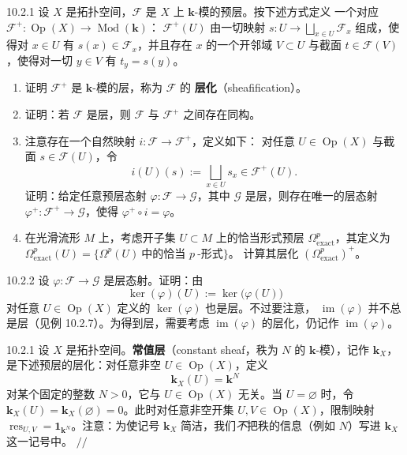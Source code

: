 \begin{wexer}{10.2.1}
  设 $X$ 是拓扑空间，$\mathcal{F}$ 是 $X$ 上 $\mathbf{k}$-模的预层。按下述方式定义
  一个对应 $\mathcal{F}^+\colon\operatorname{Op}(X)\to\operatorname{Mod}(\mathbf{k})$：
  $\mathcal{F}^+(U)$ 由一切映射 $s\colon U\to\bigsqcup_{x\in U}\mathcal{F}_x$
  组成，使得对 $x\in U$ 有 $s(x)\in\mathcal{F}_x$，并且存在 $x$ 的一个开邻域
  $V\subset U$ 与截面 $t\in\mathcal{F}(V)$，使得对一切 $y\in V$ 有
  $t_y=s(y)$。
  \begin{enumerate}[label=(\roman*)]
    \item 证明 $\mathcal{F}^+$ 是 $\mathbf{k}$-模的层，称为 $\mathcal{F}$ 的
          \textbf{层化}（sheafification）。
    \item 证明：若 $\mathcal{F}$ 是层，则 $\mathcal{F}$ 与 $\mathcal{F}^+$
          之间存在同构。
    \item 注意存在一个自然映射 $i\colon\mathcal{F}\to\mathcal{F}^+$，定义如下：
          对任意 $U\in\operatorname{Op}(X)$ 与截面 $s\in\mathcal{F}(U)$，令
          \[
            i(U)(s):=\bigsqcup_{x\in U}s_x\in\mathcal{F}^+(U).
          \]
          证明：给定任意预层态射 $\varphi\colon\mathcal{F}\to\mathcal{G}$，其中
          $\mathcal{G}$ 是层，则存在唯一的层态射
          $\varphi^+\colon\mathcal{F}^+\to\mathcal{G}$，使得
          $\varphi^+\circ i=\varphi$。
    \item 在光滑流形 $M$ 上，考虑开子集 $U\subset M$ 上的恰当形式预层
          $\Omega^p_{\mathrm{exact}}$，其定义为
          $\Omega^p_{\mathrm{exact}}(U)=\{\Omega^p(U)\ \text{中的恰当 } p\ \text{-形式}\}$。
          计算其层化 $(\Omega^p_{\mathrm{exact}})^+$。
  \end{enumerate}
\end{wexer}

\begin{wexer}{10.2.2}
  设 $\varphi\colon\mathcal{F}\to\mathcal{G}$ 是层态射。证明：由
  \[
    \ker(\varphi)(U):=\ker\bigl(\varphi(U)\bigr)
  \]
  对任意 $U\in\operatorname{Op}(X)$ 定义的 $\ker(\varphi)$ 也是层。不过要注意，
  $\operatorname{im}(\varphi)$ 并不总是层（见例 10.2.7）。为得到层，需要考虑
  $\operatorname{im}(\varphi)$ 的层化，仍记作 $\operatorname{im}(\varphi)$。
\end{wexer}

\begin{wexam}{10.2.1}
  设 $X$ 是拓扑空间。\textbf{常值层}（constant sheaf，秩为 $N$ 的
  $\mathbf{k}$-模），记作 $\mathbf{k}_X$，是下述预层的层化：对任意非空
  $U\in\operatorname{Op}(X)$，定义
  \[
    \mathbf{k}_X(U)=\mathbf{k}^N
  \]
  对某个固定的整数 $N>0$，它与 $U\in\operatorname{Op}(X)$ 无关。当 $U=\varnothing$ 时，令
  $\mathbf{k}_X(U)=\mathbf{k}_X(\varnothing)=0$。此时对任意非空开集
  $U,V\in\operatorname{Op}(X)$，限制映射
  $\operatorname{res}_{U,V}=\mathbf{1}_{\mathbf{k}^N}$。注意：为使记号
  $\mathbf{k}_X$ 简洁，我们\emph{不}把秩的信息（例如 $N$）写进 $\mathbf{k}_X$
  这一记号中。
  \hfill$//$
\end{wexam}

